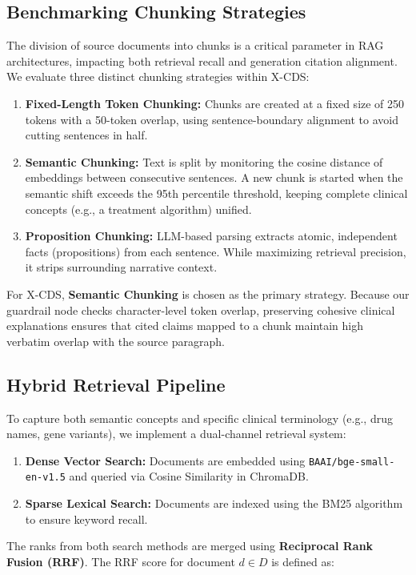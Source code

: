 \documentclass[sn-mathphys,Numbered]{sn-jnl}%
\begin{document}
\subsection{Benchmarking Chunking Strategies}
The division of source documents into chunks is a critical parameter in RAG architectures, impacting both retrieval recall and generation citation alignment. We evaluate three distinct chunking strategies within X-CDS:
\begin{enumerate}
    \item \textbf{Fixed-Length Token Chunking:} Chunks are created at a fixed size of 250 tokens with a 50-token overlap, using sentence-boundary alignment to avoid cutting sentences in half.
    \item \textbf{Semantic Chunking:} Text is split by monitoring the cosine distance of embeddings between consecutive sentences. A new chunk is started when the semantic shift exceeds the 95th percentile threshold, keeping complete clinical concepts (e.g., a treatment algorithm) unified.
    \item \textbf{Proposition Chunking:} LLM-based parsing extracts atomic, independent facts (propositions) from each sentence. While maximizing retrieval precision, it strips surrounding narrative context.
\end{enumerate}

For X-CDS, \textbf{Semantic Chunking} is chosen as the primary strategy. Because our guardrail node checks character-level token overlap, preserving cohesive clinical explanations ensures that cited claims mapped to a chunk maintain high verbatim overlap with the source paragraph.

\subsection{Hybrid Retrieval Pipeline}
To capture both semantic concepts and specific clinical terminology (e.g., drug names, gene variants), we implement a dual-channel retrieval system:
\begin{enumerate}
    \item \textbf{Dense Vector Search:} Documents are embedded using \texttt{BAAI/bge-small-en-v1.5} and queried via Cosine Similarity in ChromaDB.
    \item \textbf{Sparse Lexical Search:} Documents are indexed using the BM25 algorithm to ensure keyword recall.
\end{enumerate}

The ranks from both search methods are merged using \textbf{Reciprocal Rank Fusion (RRF)}. The RRF score for document $d \in D$ is defined as:
\end{document}
